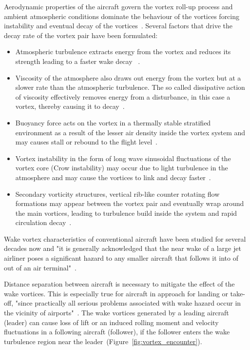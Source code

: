 Aerodynamic properties of the aircraft govern the vortex roll-up process and ambient atmospheric conditions dominate the behaviour of the vortices forcing instability and eventual decay of the vortices~\cite{Hallock2018Apr}.
Several factors that drive the decay rate of the vortex pair have been formulated:
\begin{itemize}
    \item Atmospheric turbulence extracts energy from the vortex and reduces its strength leading to a faster wake decay ~\cite{Hallock2018Apr}.
    \item Viscosity of the atmosphere also draws out energy from the vortex but at a slower rate than the atmospheric turbulence. The so called dissipative action of viscosity  effectively removes energy from a disturbance, in this case a vortex, thereby causing it to decay~\cite{Hallock2018Apr, houghton2012aerodynamics}.
    \item Buoyancy force acts on the vortex in a thermally stable stratified environment as a result of the lesser air density inside the vortex system and may causes stall or rebound to the flight level~\cite{Holzapfel2001Feb, gerz_commercial_2002}.
    \item Vortex instability in the form of long wave sinusoidal fluctuations of the vortex core (Crow instability) may occur due to light turbulence in the atmosphere and may cause the vortices to link and decay faster~\cite{dup._donamdson_vortex_1975, Hallock2018Apr, crow2003stability}.
    \item Secondary vorticity structures, vertical rib-like counter rotating flow formations may appear between the vortex pair and eventually wrap around the main vortices, leading to turbulence build inside the system and rapid circulation decay~\cite{Holzapfel2001Feb, Holzapfel2003Jun}.
\end{itemize}

Wake vortex characteristics of conventional aircraft have been studied for several decades now and "it is generally acknowledged that the near wake of a large jet airliner poses a significant hazard to any smaller aircraft that follows it into of out of an air terminal"~\cite[p.~5]{dup._donamdson_vortex_1975}.

Distance separation between aircraft is necessary to mitigate the effect of the wake vortices. This is especially true for aircraft in approach for landing or take-off, "since practically all serious problems associated with wake hazard occur in the vicinity of airports"~\cite[p.~5]{dup._donamdson_vortex_1975}. 
The wake vortices generated by a leading aircraft (leader) can cause loss of lift or an induced rolling moment and velocity fluctuations in a following aircraft (follower), if the follower enters the wake turbulence region near the leader~(Figure~\ref{fig:vortex_encounter}).

